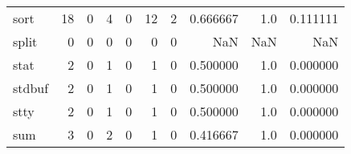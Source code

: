 \begin{tabular}{lrrrrrrrrr}
sort      &                                      18 &                                                  0 &                                                  4 &                                                  0 &                                                 12 &                                                  2 &                                           0.666667 &                                    1.0 &                             0.111111 \\
split     &                                       0 &                                                  0 &                                                  0 &                                                  0 &                                                  0 &                                                  0 &                                                NaN &                                    NaN &                                  NaN \\
stat      &                                       2 &                                                  0 &                                                  1 &                                                  0 &                                                  1 &                                                  0 &                                           0.500000 &                                    1.0 &                             0.000000 \\
stdbuf    &                                       2 &                                                  0 &                                                  1 &                                                  0 &                                                  1 &                                                  0 &                                           0.500000 &                                    1.0 &                             0.000000 \\
stty      &                                       2 &                                                  0 &                                                  1 &                                                  0 &                                                  1 &                                                  0 &                                           0.500000 &                                    1.0 &                             0.000000 \\
sum       &                                       3 &                                                  0 &                                                  2 &                                                  0 &                                                  1 &                                                  0 &                                           0.416667 &                                    1.0 &                             0.000000 \\

\end{tabular}
